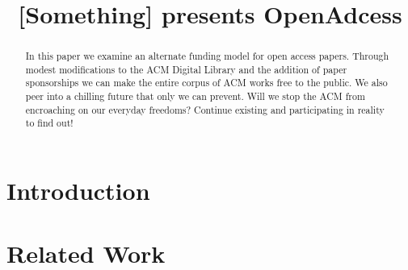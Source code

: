 \documentclass[sigtbd]{sigtbd17-style}
\newcommand{\todo}[1]
{{\bf\color{red}[#1]}}
\begin{document}
\title{\todo{Something} presents OpenAdcess}
\maketitle

\begin{abstract}
  In this paper we examine an alternate funding model for open access papers.
  Through modest modifications to the ACM Digital Library and the addition of
  paper sponsorships we can make the entire corpus of ACM works free to the
  public.
  We also peer into a chilling future that only we can prevent.
  Will we stop the ACM from encroaching on our everyday freedoms?
  Continue existing and participating in reality to find out!
\end{abstract}

\section{Introduction}

\section{Related Work}






\end{document}
